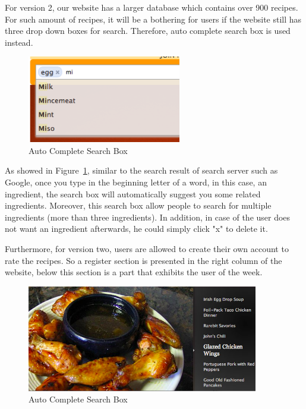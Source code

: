 For version 2, our website has a larger database which contains over 900 recipes. For such amount of recipes, it will be a bothering for users if the website still has three drop down boxes for search. Therefore, auto complete search box is used instead. 

\begin{figure}[h]
\includegraphics[width=0.6\textwidth]{auto_complete}
\caption{Auto Complete Search Box}
\label{fig:auto_complete}
\end{figure}

As showed in Figure~\ref{fig:auto_complete}, similar to the search result of search server such as Google, once you type in the beginning letter of a word, in this case, an ingredient, the search box will automatically suggest you some related ingredients. Moreover, this search box allow people to search for multiple ingredients (more than three ingredients). In addition, in case of the user does not want an ingredient afterwards, he could simply click "x" to delete it.

Furthermore, for version two, users are allowed to create their own account to rate the recipes. So a register section is presented in the right column of the website, below this section is a part that exhibits the user of the week. 

\begin{figure}[H]
\includegraphics[width=0.9\textwidth]{slideshow}
\caption{Auto Complete Search Box}
\label{fig:slideshow}
\end{figure}

